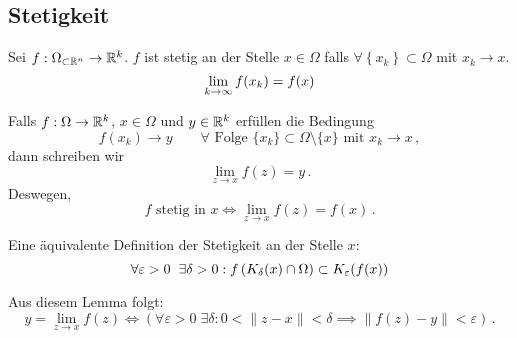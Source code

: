 \subsection{Stetigkeit}
\begin{Def}\label{d:stetig}
  Sei $f:\Omega_{\subset\mathbb{R}^n}\rightarrow\mathbb{R}^k$. $f$ ist stetig an der Stelle $x\in\Omega$ falls $\forall \left\{ x_k \right\}\subset\Omega$ mit $x_k\to x$.
  \[\displaystyle\lim_{k\rightarrow\infty} f(x_k)=f(x)\]
\end{Def}
Falls $f: \Omega\rightarrow \mathbb{R}^k$, $x\in \Omega$ und $y\in \mathbb{R}^k$ erf\"ullen die Bedingung 
\[
f(x_k) \to y \qquad \forall \mbox{ Folge }\{x_k\}\subset \Omega\setminus \{x\} \mbox{ mit } x_k\to x\, ,
\]
dann schreiben wir
\[
\lim_{z\to x} f(z) = y\, .
\]
Deswegen,
\[
f \mbox{ stetig in } x \iff \lim_{z\to x} f(z) = f(x)\, .
\]
\begin{Lem}
  \label{l:1102282}
  Eine \"aquivalente Definition der Stetigkeit an der Stelle $x$:
  \[\forall \varepsilon>0\hspace{2mm}\exists \delta>0: f\left( K_\delta(x)\cap \Omega \right)\subset K_\varepsilon(f(x))\]
\end{Lem}
\begin{Bem}
Aus diesem Lemma folgt:
\[
y = \lim_{z\to x} f(z) \iff  (\forall \varepsilon > 0\; \exists \delta : 0<\|z-x\|<\delta \implies \|f(z)-y\|<\varepsilon)\, .
\]
\end{Bem}

